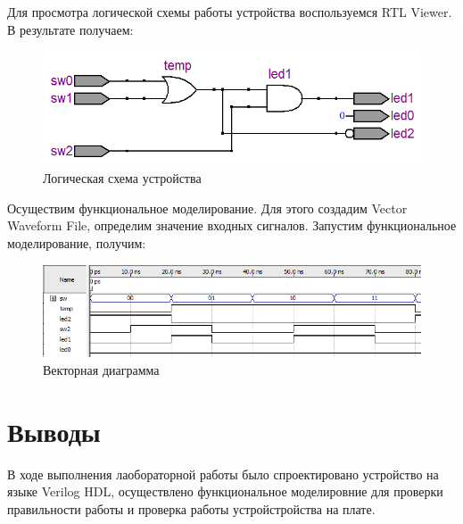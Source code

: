 \documentclass[utf8x, 12pt]{G7-32}
\begin{document}
Для просмотра логической схемы работы устройства воспользуемся RTL Viewer. В результате получаем:

\begin{figure}[hhh!]
	\begin{center}
		\includegraphics[width=12cm]{img/RTL_Viewer}
	\end{center}
	\vspace{-5mm}\caption{Логическая схема устройства}
\end{figure}


Осуществим функциональное моделирование. Для этого создадим Vector Waveform File, определим значение входных сигналов. Запустим функциональное моделирование, получим:

\begin{figure}[hhh!]
	\begin{center}
		\includegraphics[width=12cm]{img/waveform}
	\end{center}
	\vspace{-5mm}\caption{Векторная диаграмма}
\end{figure}


\chapter{Выводы}

В ходе выполнения лаобораторной работы было спроектировано устройство на языке Verilog HDL, осуществлено функциональное моделировние для проверки правильности работы и проверка работы устройстройства на плате.
\end{document}
